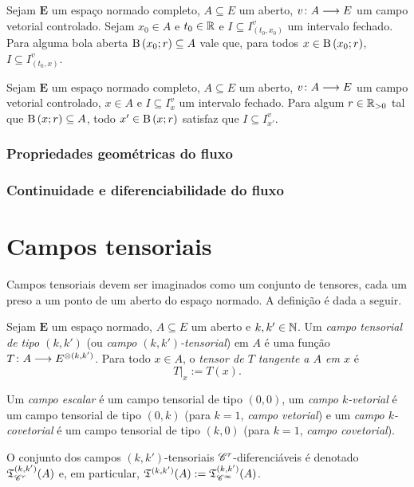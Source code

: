 \begin{proposition}
Sejam $\bm E$ um espaço normado completo, $A \subseteq E$ um aberto, $v\colon \allowbreak A \longrightarrow E$ um campo vetorial controlado. Sejam $x_0 \in A$ e $t_0 \in \mathbb{R}$ e $I \subseteq I^v_{(t_0,x_0)}$ um intervalo fechado. Para alguma bola aberta $\mathrm{B}\left(x_0; r\right) \subseteq A$ vale que, para todos $x \in \mathrm{B}\left(x_0; r\right)$, $I \subseteq I^v_{(t_0,x)}$.
\end{proposition}

\begin{proposition}
Sejam $\bm E$ um espaço normado completo, $A \subseteq E$ um aberto, $v\colon \allowbreak A \longrightarrow E$ um campo vetorial controlado, $x \in A$ e $I \subseteq I^v_x$ um intervalo fechado. Para algum $r \in \mathbb{R}_{>0}$ tal que $\mathrm{B}\left(x; r\right) \subseteq A$, todo $x' \in \mathrm{B}\left(x; r\right)$ satisfaz que $I \subseteq I^v_{x'}$.
\end{proposition}





\subsubsection{Propriedades geométricas do fluxo}


\subsubsection{Continuidade e diferenciabilidade do fluxo}














\section{Campos tensoriais}

Campos tensoriais devem ser imaginados como um conjunto de tensores, cada um preso a um ponto de um aberto do espaço normado. A definição é dada a seguir.

\begin{definition}
Sejam $\bm E$ um espaço normado, $A \subseteq E$ um aberto e $k,k' \in \mathbb{N}$. Um \emph{campo tensorial de tipo $(k,k')$} (ou \emph{campo $(k,k')$-tensorial}) em $A$ é uma função $T\colon \allowbreak A \longrightarrow E^{\otimes(k,k')}$. Para todo $x \in A$, o \emph{tensor de $T$ tangente a $A$ em $x$} é
	\begin{equation*}
	T|_x := T(x).
	\end{equation*}
	
Um \emph{campo escalar} é um campo tensorial de tipo $(0,0)$, um \emph{campo $k$-vetorial} é um campo tensorial de tipo $(0,k)$ (para $k=1$, \emph{campo vetorial}) e um \emph{campo $k$-covetorial} é  um campo tensorial de tipo $(k,0)$ (para $k=1$, \emph{campo covetorial}).
	
O conjunto dos campos $(k,k')$-tensoriais $\mathscr{C}^r$-diferenciáveis é denotado $\mathfrak{T}^{(k,k')}_{\mathscr{C}^r}(A)$ e, em particular, $\mathfrak{T}^{(k,k')}(A) := \mathfrak{T}^{(k,k')}_{\mathscr{C}^\infty}(A)$.
\end{definition}

